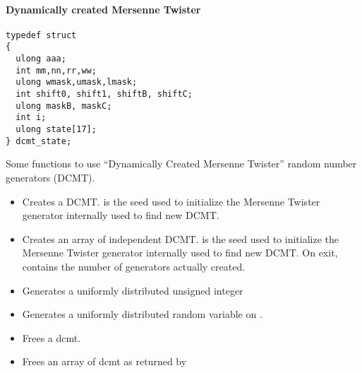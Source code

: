 \paragraph{Dynamically created Mersenne Twister}

\begin{verbatim}
typedef struct
{
  ulong aaa;
  int mm,nn,rr,ww;
  ulong wmask,umask,lmask;
  int shift0, shift1, shiftB, shiftC;
  ulong maskB, maskC;
  int i;
  ulong state[17];
} dcmt_state;
\end{verbatim}

Some functions to use ``Dynamically Created Mersenne Twister'' random number
generators (DCMT).
\begin{itemize}
\item {}
  \sshortdescribe Creates a DCMT.  is the seed used to initialize
  the Mersenne Twister generator internally used to find new DCMT.
\item {}
  \sshortdescribe Creates an array of  independent DCMT.  is
  the seed used to initialize the Mersenne Twister generator internally used to
  find new DCMT. On exit,  contains the number of generators actually
  created.
\item {}
  \sshortdescribe Generates a uniformly distributed unsigned integer
\item {}
  \sshortdescribe Generates a uniformly distributed random variable on \var{[0,1]}.
\item {}
  \sshortdescribe Frees a dcmt.
\item {}
  \sshortdescribe Frees an array of dcmt as returned by 
\end{itemize}

\clearpage

